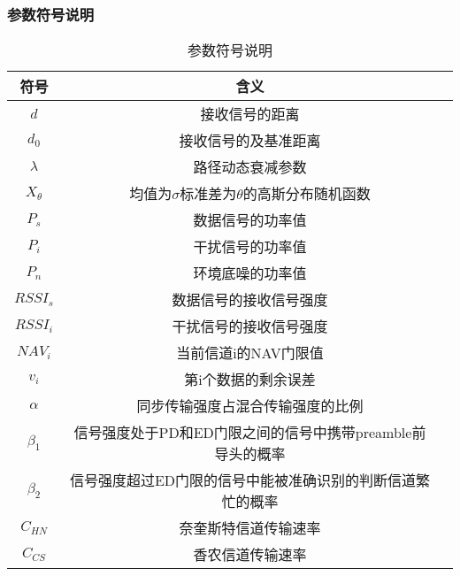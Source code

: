 \subsubsection{参数符号说明}
\begin{longtable}{ c c c }
	\caption{参数符号说明} \\ %
	\hline
	符号 & 含义   \\ %
	\hline
	
	$d$	& 接收信号的距离\\
	$d_0$ &	接收信号的及基准距离\\
	$ \lambda $	& 路径动态衰减参数\\
	$X_{\theta}$ &	均值为$\sigma$标准差为$\theta$的高斯分布随机函数\\
	$P_s$ &	数据信号的功率值\\
	$P_i$ &	干扰信号的功率值\\
	$P_n$ &	环境底噪的功率值\\
	$RSSI_s$ &	数据信号的接收信号强度\\
	$RSSI_i$ &	干扰信号的接收信号强度\\
	$NAV_i$ &	当前信道i的NAV门限值\\
	$v_i$ &	第i个数据的剩余误差\\
	$ \alpha $ &	同步传输强度占混合传输强度的比例\\
	$\beta_1$ &	信号强度处于PD和ED门限之间的信号中携带preamble前导头的概率\\
	$\beta_2$ &	信号强度超过ED门限的信号中能被准确识别的判断信道繁忙的概率\\
	$C_{HN}$ &	奈奎斯特信道传输速率\\
	$C_{CS}$ &	香农信道传输速率\\
	
	\hline
\end{longtable}